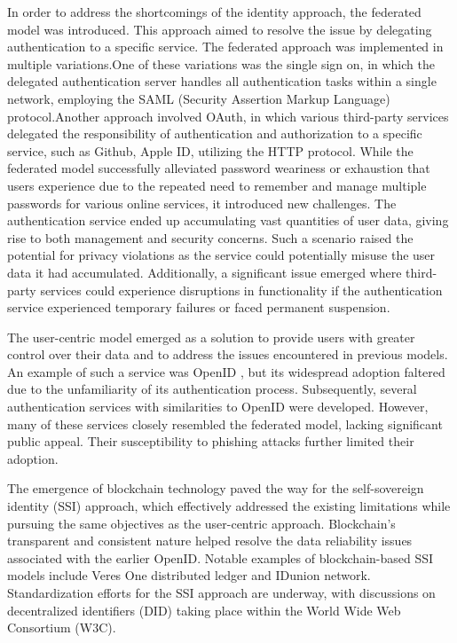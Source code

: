 In order to address the shortcomings of the identity approach, the federated model was introduced. This approach aimed to resolve the issue by delegating authentication to a specific service. The federated approach was implemented in multiple variations.One of these variations was the single sign on, in which the delegated authentication server handles all authentication tasks within a single network, employing the SAML (Security Assertion Markup Language) protocol.Another approach involved OAuth, in which various third-party services delegated the responsibility of authentication and authorization to a specific service, such as Github, Apple ID,  utilizing the HTTP protocol. While the federated model successfully alleviated password weariness or exhaustion that users experience due to the repeated need to remember and manage multiple passwords for various online services, it introduced new challenges. The authentication service ended up accumulating vast quantities of user data, giving rise to both management and security concerns. Such a scenario raised the potential for privacy violations as the service could potentially misuse the user data it had accumulated. Additionally, a significant issue emerged where third-party services could experience disruptions in functionality if the authentication service experienced temporary failures or faced permanent suspension.
\par
The user-centric model emerged as a solution to provide users with greater control over their data and to address the issues encountered in previous models. An example of such a service was OpenID , but its widespread adoption faltered due to the unfamiliarity of its authentication process. Subsequently, several authentication services with similarities to OpenID were developed. However, many of these services closely resembled the federated model, lacking significant public appeal. Their susceptibility to phishing attacks further limited their adoption.
\par
The emergence of blockchain technology paved the way for the self-sovereign identity (SSI) approach, which effectively addressed the existing limitations while pursuing the same objectives as the user-centric approach. Blockchain's transparent and consistent nature helped resolve the data reliability issues associated with the earlier OpenID. Notable examples of blockchain-based SSI models include Veres One distributed ledger and IDunion network. Standardization efforts for the SSI approach are underway, with discussions on decentralized identifiers (DID) taking place within the World Wide Web Consortium (W3C).
